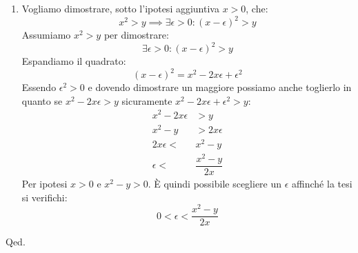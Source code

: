 {\begin{enumerate}[label=(\Alph*)]
        \item Vogliamo dimostrare, sotto l'ipotesi aggiuntiva $x > 0$, che:
            \begin{equation*}
                x^2 > y \implies \exists \epsilon > 0: (x - \epsilon)^2 > y
            \end{equation*}
            Assumiamo $x^2 > y$ per dimostrare:
            \begin{equation*}
                \exists \epsilon > 0: (x - \epsilon)^2 > y
            \end{equation*}
            Espandiamo il quadrato:
            \begin{equation*}
                (x-\epsilon)^2 = x^2 -2x\epsilon + \epsilon^2
            \end{equation*}
            Essendo $\epsilon^2 > 0$ e dovendo dimostrare un maggiore possiamo 
            anche toglierlo in quanto se $x^2 -2x\epsilon > y$ sicuramente 
            $x^2 -2x\epsilon + \epsilon^2 > y$:
            \begin{align*}
                x^2 -2x\epsilon &> y\\
                x^2 - y &> 2x\epsilon\\
                2x\epsilon < &x^2 - y\\
                \epsilon < &\dfrac{x^2-y}{2x}
            \end{align*}
            Per ipotesi $x > 0$ e $x^2-y > 0$. È quindi possibile scegliere un 
            $\epsilon$ affinché la tesi si verifichi:
            \begin{equation*}
                0 < \epsilon < \dfrac{x^2-y}{2x}
            \end{equation*}
    \end{enumerate}
    \hfill Qed.
}    


